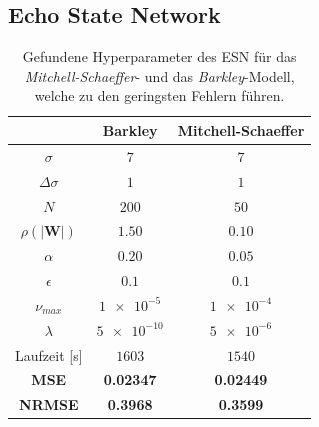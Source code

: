 \FloatBarrier
\subsection{Echo State Network}

\begin{table}[h]
	\centering
	\captionsetup{width=0.9\linewidth}
	\begin{tabular}{|c|c|c|}
		\multicolumn{1}{c|}{} &  Barkley & Mitchell-Schaeffer \\ 
		\hline \hline 
		\rule[-1ex]{0pt}{2.5ex} $\sigma$ & $7$ & $7$ \\ 
		\hline 
		\rule[-1ex]{0pt}{2.5ex} $\Delta \sigma$ & $1$ & $1$ \\ 
		\hline 
		\rule[-1ex]{0pt}{3.5ex} $N$ & $200$ & $50$ \\ 
		\hline 
		\rule[-1ex]{0pt}{3.5ex} $\rho(|\mathbf{W}|)$ & $1.50$ & $0.10$\\ 
		\hline 
		\rule[-1ex]{0pt}{3.5ex} $\alpha$ & $0.20$ & $0.05$ \\ 
		\hline 
		\rule[-1ex]{0pt}{3.5ex} $\epsilon$ & $0.1$ & $0.1$ \\ 
		\hline 
		\rule[-1ex]{0pt}{3.5ex} $\nu_{max}$ & $\num{1e-5}$ & $\num{1e-4}$\\ 
		\hline 
		\rule[-1ex]{0pt}{3.5ex} $\lambda$ & $\num{5e-10}$ & $\num{5e-6}$\\ 
		\hline 
		\rule[-1ex]{0pt}{2.5ex} Laufzeit [s] & $1603$ & $1540$ \\ 
		\hline 
		\rule[-1ex]{0pt}{2.5ex} \textbf{MSE} & \textbf{0.02347} & \textbf{0.02449} \\ 
		\hline
		\rule[-1ex]{0pt}{2.5ex} \textbf{NRMSE} & \textbf{0.3968} & \textbf{0.3599} \\ 
		\hline 
	\end{tabular} 
	\caption{Gefundene Hyperparameter des \textsc{ESN} für das \textit{Mitchell-Schaeffer}- und das \textit{Barkley}-Modell, welche zu den geringsten Fehlern führen.}
	\label{tab:exp_unblur_esn_results}
\end{table}

\FloatBarrier
